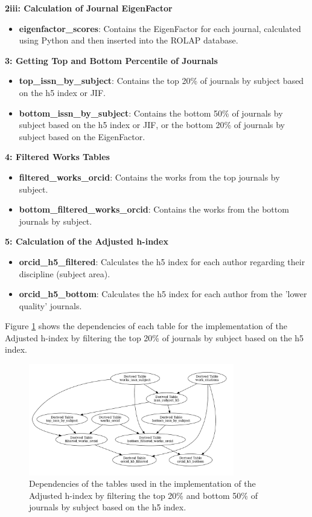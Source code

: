 \noindent\textbf{2iii: Calculation of Journal EigenFactor}
\begin{itemize}
      \item \textbf{eigenfactor\_scores}: Contains the EigenFactor for each journal, calculated using Python and then inserted into the ROLAP database.
\end{itemize}

\noindent\textbf{3: Getting Top and Bottom Percentile of Journals}
\begin{itemize}
      \item \textbf{top\_issn\_by\_subject}: Contains the top 20\% of journals by subject based on the h5 index or JIF.
      \item \textbf{bottom\_issn\_by\_subject}: Contains the bottom 50\% of journals by subject based on the h5 index or JIF, or the bottom 20\% of journals by subject based on the EigenFactor.
\end{itemize}

\noindent\textbf{4: Filtered Works Tables}
\begin{itemize}
      \item \textbf{filtered\_works\_orcid}: Contains the works from the top journals by subject.
      \item \textbf{bottom\_filtered\_works\_orcid}: Contains the works from the bottom journals by subject.
\end{itemize}

\noindent\textbf{5: Calculation of the Adjusted h-index}
\begin{itemize}
      \item \textbf{orcid\_h5\_filtered}: Calculates the h5 index for each author regarding their discipline (subject area).
      \item \textbf{orcid\_h5\_bottom}: Calculates the h5 index for each author from the 'lower quality' journals.
\end{itemize}

Figure \ref{fig:tables} shows the dependencies of each table for the
implementation of the Adjusted h-index by filtering the top 20\% of journals by
subject based on the h5 index.

\begin{figure}[H]
      \centering
      \includegraphics[width=0.8\textwidth]{../figs/h5.pdf}
      \caption{Dependencies of the tables used in the implementation of the Adjusted h-index by filtering the top 20\% and bottom 50\% of journals by subject based on the h5 index.}
      \label{fig:tables}
\end{figure}

